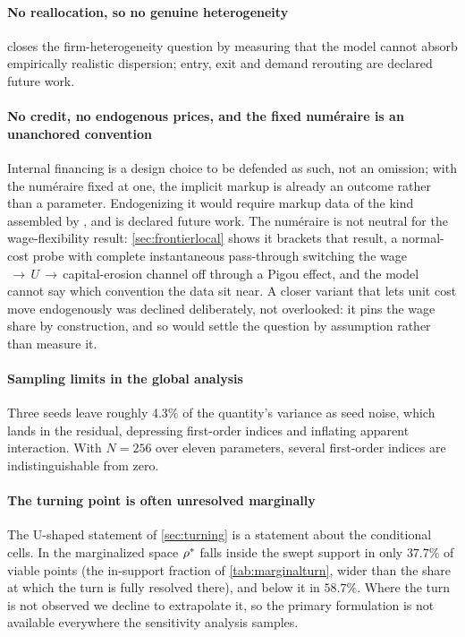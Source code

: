 \paragraph{No reallocation, so no genuine heterogeneity} 
closes the firm-heterogeneity question by measuring that the model cannot absorb
empirically realistic dispersion; entry, exit and demand rerouting are declared
future work.

\paragraph{No credit, no endogenous prices, and the fixed numéraire is an unanchored convention} Internal financing is a design choice to be defended as
such, not an omission; with the numéraire fixed at one, the implicit markup is
already an outcome rather than a parameter. Endogenizing it would require markup
data of the kind assembled by \citet{DeLoecker2020}, and is declared future
work. The numéraire is not neutral for the wage-flexibility result:
\cref{sec:frontierlocal} shows it brackets that result, a normal-cost probe with
complete instantaneous pass-through switching the
wage$\,\to\,U\,\to\,$capital-erosion channel off through a Pigou effect, and the
model cannot say which convention the data sit near. A closer variant that lets
unit cost move endogenously was declined deliberately, not overlooked: it pins
the wage share by construction, and so would settle the question by assumption
rather than measure it.

\paragraph{Sampling limits in the global analysis} Three seeds leave roughly 4.3\%
of the quantity's variance as seed noise, which lands in the residual,
depressing first-order indices and inflating apparent interaction. With
$N = 256$ over eleven parameters, several first-order indices are
indistinguishable from zero.

\paragraph{The turning point is often unresolved marginally} The U-shaped
statement of \cref{sec:turning} is a statement about the conditional cells. In
the marginalized space $\rho^{\ast}$ falls inside the swept support in only
$37.7\%$ of viable points (the in-support fraction of \cref{tab:marginalturn},
wider than the share at which the turn is fully resolved there), and below it in
$58.7\%$. Where the turn is not
observed we decline to extrapolate it, so the primary formulation is not
available everywhere the sensitivity analysis samples.


